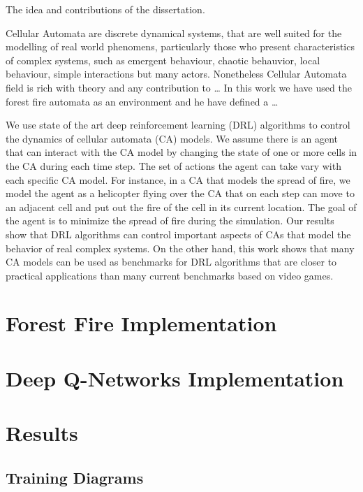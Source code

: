 \documentclass[
]{book}
\begin{document}
The idea and contributions of the dissertation.

Cellular Automata are discrete dynamical systems, that are well suited for the modelling of real world phenomens, particularly those who present characteristics of complex systems, such as emergent behaviour, chaotic behauvior, local behaviour, simple interactions but many actors.
Nonetheless Cellular Automata field is rich with theory and any contribution to \ldots{}
In this work we have used the forest fire automata as an environment and he have defined a \ldots{}

We use state of the art deep reinforcement learning (DRL) algorithms to control the dynamics of
cellular automata (CA) models. We assume there is an agent that can interact with the CA model by
changing the state of one or more cells in the CA during each time step. The set of actions the agent
can take vary with each specific CA model. For instance, in a CA that models the spread of fire, we
model the agent as a helicopter flying over the CA that on each step can move to an adjacent cell and
put out the fire of the cell in its current location. The goal of the agent is to minimize the spread of
fire during the simulation. Our results show that DRL algorithms can control important aspects of
CAs that model the behavior of real complex systems. On the other hand, this work shows that many
CA models can be used as benchmarks for DRL algorithms that are closer to practical applications
than many current benchmarks based on video games.

\hypertarget{forest-fire-implementation}{%
\section{Forest Fire Implementation}\label{forest-fire-implementation}}

\hypertarget{deep-q-networks-implementation}{%
\section{Deep Q-Networks Implementation}\label{deep-q-networks-implementation}}

\hypertarget{results}{%
\section{Results}\label{results}}

\hypertarget{training-diagrams}{%
\subsection{Training Diagrams}\label{training-diagrams}}
\end{document}
